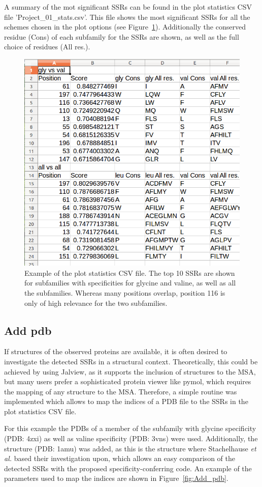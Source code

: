 \documentclass[a4paper,10pt]{article}
\begin{document}
A summary of the mot significant SSRs can be found in the plot statistics CSV file 'Project\_01\_stats.csv'. This file shows the most significant 
SSRs for all the schemes chosen in the plot options (see Figure~\ref{fig:plot_stats}). Additionally the conserved residue (Cons) of each subfamily
for the SSRs are shown, as well as the full choice of residues (All res.).

\begin{figure}
  \includegraphics[width=0.6\linewidth]{./figs/plot_stats}
  \caption{Example of the plot statistics CSV file. The top 10 SSRs are shown for subfamilies with specificities for glycine and valine, 
  as well as all the subfamilies. Whereas many positions overlap, position 116 is only of high relevance for the two subfamilies.}
  \label{fig:plot_stats}
\end{figure}

\subsection{Add pdb}

If structures of the observed proteins are available, it is often desired to investigate the detected SSRs in a structural context.
Theoretically, this could be achieved by using Jalview, as it supports the inclusion of structures to the MSA, but many users 
prefer a sophisticated protein viewer like pymol, which requires the mapping of any structure to the MSA.
Therefore, a simple routine was implemented which allows to map the indices of a PDB file to the SSRs in the plot statistics CSV file.

For this example the PDBs of a member of the subfamily with glycine specificity (PDB: 4zxi) as well as valine specificity (PDB: 3vns) were used.
Additionally, the structure (PDB: 1amu) was added, as this is the structure where Stachelhause \textit{et al.} \cite{stachelhaus_specificity-conferring_1999} based their investigation upon, which  
allows an easy comparison of the detected SSRs with the proposed specificity-conferring code. 
An example of the parameters used to map the indices are shown in Figure~\ref{fig:Add_pdb}.
\end{document}
